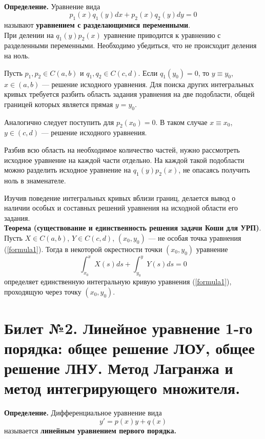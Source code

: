 \documentclass{article}
\begin{document}
\\
\textbf{Определение.} Уравнение вида
\begin{equation}
    p_1(x)q_1(y)dx + p_2(x)q_2(y)dy = 0 \label{formula3}
\end{equation}
называют \textbf{уравнением с разделающимися переменными}.\\

При делении на $q_1(y)p_2(x)$ уравнение приводится к уравнению с разделенными переменными. Необходимо убедиться, что не происходит деления на ноль.

Пусть $p_1, p_2 \in C(a,b)$ и $q_1, q_2 \in C(c,d)$. Если $q_1(y_0) = 0$, то $y \equiv y_0$, $x \in (a,b)$ --- решение исходного уравнения. Для поиска других интегральных кривых требуется разбить область задания уравнения на две подобласти, общей границей которых является прямая $y = y_0$.

Аналогично следует поступить для $p_2(x_0) = 0$. В таком случае $x \equiv x_0$, $y \in (c,d)$ --- решение исходного уравнения.

Разбив всю область на необходимое количество частей, нужно рассмотреть исходное уравнение на каждой части отдельно. На каждой такой подобласти можно разделить исходное уравнение на $q_1(y)p_2(x)$, не опасаясь получить ноль в знаменателе.

Изучив поведение интегральных кривых вблизи границ, делается вывод о наличии особых и составных решений уравнения на исходной области его задания.\\

\textbf{Теорема (существование и единственность решения задачи Коши для УРП)}. Пусть $X \in C(a,b)$, $Y \in C(c,d)$, $(x_0, y_0)$ --- не особая точка уравнения (\ref{formula1}). Тогда в некоторой окрестности точки $(x_0, y_0)$ уравнение
\begin{equation*}
    \int_{x_0}^{x} X(s)ds + \int_{y_0}^{y} Y(s)ds = 0
\end{equation*}
определяет единственную интегральную кривую уравнения (\ref{formula1}), проходящую через точку $(x_0, y_0)$.

\section{Билет №2. Линейное уравнение 1-го порядка: общее решение ЛОУ, общее решение
ЛНУ. Метод Лагранжа и метод интегрирующего множителя.}
\textbf{Определение.} Дифференциальное уравнение вида
\begin{equation}
    y' = p(x)y + q(x) \label{lnu}
\end{equation}
называется \textbf{линейным уравнением первого порядка.}\\
\end{document}

